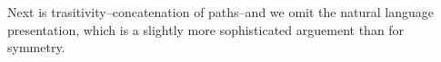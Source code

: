 Next is trasitivity--concatenation of paths--and we omit the natural language
presentation, which is a slightly more sophisticated arguement than for
symmetry.  


\begin{code}%
\>[0][@{}l@{\AgdaIndent{1}}]%
\>[2]\AgdaSpace{}%
\AgdaSymbol{:}\AgdaSpace{}%
\AgdaSymbol{\{}\AgdaSpace{}%
\AgdaSymbol{:}\AgdaSpace{}%
\AgdaSymbol{\}}\AgdaSpace{}%
\AgdaSpace{}%
\AgdaSymbol{\{}\AgdaSpace{}%
\AgdaSpace{}%
\AgdaSymbol{:}\AgdaSpace{}%
\AgdaSymbol{\}}\AgdaSpace{}%
\AgdaSpace{}%
\AgdaSymbol{(}\AgdaSpace{}%
\AgdaSymbol{:}\AgdaSpace{}%
\AgdaSpace{}%
\AgdaSpace{}%
\AgdaSymbol{)}\AgdaSpace{}%
\AgdaSpace{}%
\AgdaSymbol{\{}\AgdaSpace{}%
\AgdaSymbol{:}\AgdaSpace{}%
\AgdaSymbol{\}}\AgdaSpace{}%
\AgdaSpace{}%
\AgdaSymbol{(}\AgdaSpace{}%
\AgdaSymbol{:}\AgdaSpace{}%
\AgdaSpace{}%
\AgdaSpace{}%
\AgdaSymbol{)}\AgdaSpace{}%
\AgdaSpace{}%
\AgdaSpace{}%
\AgdaSpace{}%
\<%
\\
%
\>[2]%
\>[201I]\AgdaSymbol{\{}\AgdaSymbol{\}}\AgdaSpace{}%
\AgdaSymbol{\{}\AgdaSymbol{\}}\AgdaSpace{}%
\AgdaSymbol{\{}\AgdaSymbol{\}}\AgdaSpace{}%
\AgdaSpace{}%
\AgdaSymbol{\{}\AgdaSymbol{\}}\AgdaSpace{}%
\AgdaSpace{}%
\AgdaSymbol{=}\AgdaSpace{}%
\AgdaSpace{}%
\AgdaSpace{}%
\AgdaSpace{}%
\AgdaSpace{}%
\AgdaSpace{}%
\AgdaSpace{}%
\AgdaSpace{}%
\<%
\\
\>[.][@{}l@{}]\<[201I]%
\>[6]\<%
\\
%
\>[6]\AgdaSpace{}%
\AgdaSymbol{:}\AgdaSpace{}%
\AgdaSymbol{(}\AgdaSpace{}%
\AgdaSpace{}%
\AgdaSymbol{:}\AgdaSpace{}%
\AgdaSymbol{)}\AgdaSpace{}%
\AgdaSpace{}%
\AgdaSpace{}%
\AgdaSpace{}%
\AgdaSpace{}%
\AgdaSpace{}%
\<%
\\
%
\>[6]\AgdaSpace{}%

\end{code}
